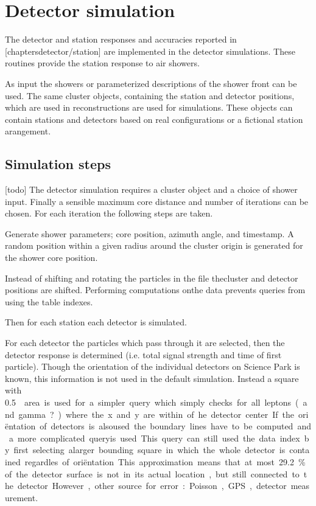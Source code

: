 \section{Detector simulation}

The detector and station responses and accuracies reported in [chaptersdetector/station] are implemented in the detector simulations. These routines provide the station response to air showers.

As input the \corsika showers or parameterized descriptions of the shower front can be used. The same cluster objects, containing the station and detector positions, which are used in reconstructions are used for simulations. These objects can contain stations and detectors based on real configurations or a fictional station arangement.


\subsection{Simulation steps}
[todo]
The detector simulation requires a cluster object and a choice of shower input. Finally a sensible maximum core distance and number of iterations can be chosen. For each iteration the following steps are taken.

Generate shower parameters; core position, azimuth angle, and timestamp. A random position within a given radius around the cluster origin is generated for the shower core position.

Instead of shifting and rotating the particles in the \corsika file thecluster and detector positions are shifted. Performing computations onthe \corsika data prevents queries from using the table indexes.

Then for each station each detector is simulated.

For each detector the particles which pass through it are selected, then the detector response is determined (i.e. total signal strength and time of first particle). Though the orientation of the individual detectors on Science Park is known, this information is not used in the default simulation. Instead a square with \SI{.5}{\meter\square} area is used for a simpler query which simply checks for all leptons (and gamma?) where the x and y are within .. of he detector center. If the oriëntation of detectors is alsoused the boundary lines have to be computed and a more complicated queryis used. This query can still used the data index by first selecting alarger bounding square in which the whole detector is contained regardles of oriëntation. This approximation means that at most\SI{29.2}{\percent} of the detector surface is not in its actual location, but still connected to the detector. However, other source for error: Poisson, GPS, detector measurement.

